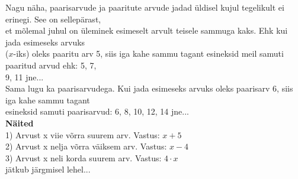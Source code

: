 \begin{center}
{{{\begin{flushleft}
\vspace{2mm}
\hspace{5mm}
Nagu näha, paarisarvude ja paaritute arvude jadad üldisel kujul tegelikult ei erinegi. See on sellepärast,\\ \hspace{5mm} et mõlemal juhul on üleminek esimeselt arvult teisele sammuga kaks. Ehk kui jada esimeseks arvuks\\ \hspace{5mm} ($x$-iks) oleks  paaritu arv 5, siis iga kahe sammu tagant esineksid meil samuti paaritud arvud ehk: 5, 7,\\ \hspace{5mm} 9, 11 jne...\\
\hspace{5mm}
Sama lugu ka paarisarvudega. Kui jada esimeseks arvuks oleks paarisarv 6, siis iga kahe sammu tagant\\ \hspace{5mm} esineksid samuti paarisarvud: 6, 8, 10, 12, 14 jne...\\

\vspace{5mm}
\hspace{5mm}
\textbf{Näited}\\
\vspace{2mm}
\hspace{5mm}
1) Arvust x viie võrra suurem arv. \hspace{5mm} Vastus: $x+5$\\
\hspace{5mm}
2) Arvust x nelja võrra väiksem arv. \hspace{5mm} Vastus: $x-4$\\
\hspace{5mm}
3) Arvust x neli korda suurem arv. \hspace{5mm} Vastus: $4\cdot x$\\ 
\vspace{2mm}
\hspace{7mm}
jätkub järgmisel lehel...
\end{flushleft}
}}}
\end{center}

\newpage

